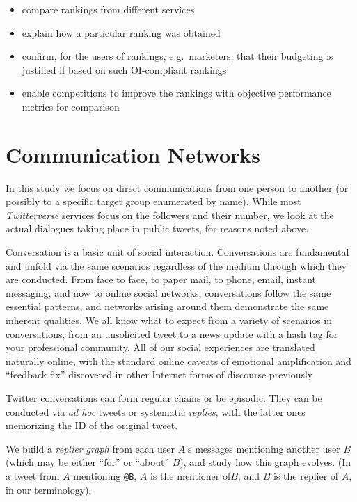 \documentclass[10pt,oneside]{memoir}
\begin{document}
\begin{itemize}


\item compare rankings from different services

\item explain how a particular ranking was obtained

\item confirm, for the users of rankings, e.g.\ marketers, that their budgeting is justified if based on such OI-compliant rankings

\item enable competitions to improve the rankings with objective performance metrics for comparison
\end{itemize}

\pagebreak \section{Communication Networks}
\label{communicationnetworks}

In this study we focus on direct communications from one person to another (or possibly to a specific target group enumerated by name).  While most {\itshape Twitterverse} services focus on the followers and their number, we look at the actual dialogues taking place in public tweets, for reasons noted above.


Conversation is a basic unit of social interaction.  Conversations are fundamental and unfold via the same scenarios regardless of the medium through which they are conducted.  From face to face, to paper mail, to phone, email, instant messaging, and now to online social networks, conversations follow the same essential patterns, and networks arising around them demonstrate the same inherent qualities.  We all know what to expect from a variety of scenarios in conversations, from an unsolicited tweet to a news update with a hash tag for your professional community.  All of our social experiences are translated naturally online, with the standard online caveats of emotional amplification and ``feedback fix'' discovered in other Internet forms of discourse previously


Twitter conversations can form regular chains or be episodic.  They can be conducted via {\itshape ad hoc} tweets or systematic {\itshape replies}, with the latter ones memorizing the ID of the original tweet.


We build a {\itshape replier graph} from each user $A$'s messages mentioning another user $B$ (which may be either ``for'' or ``about'' $B$), and study how this graph evolves.  (In a tweet from $A$ mentioning \verb|@B|,  $A$ is the mentioner of$B$, and $B$ is the replier of $A$, in our terminology). 
\end{document}
